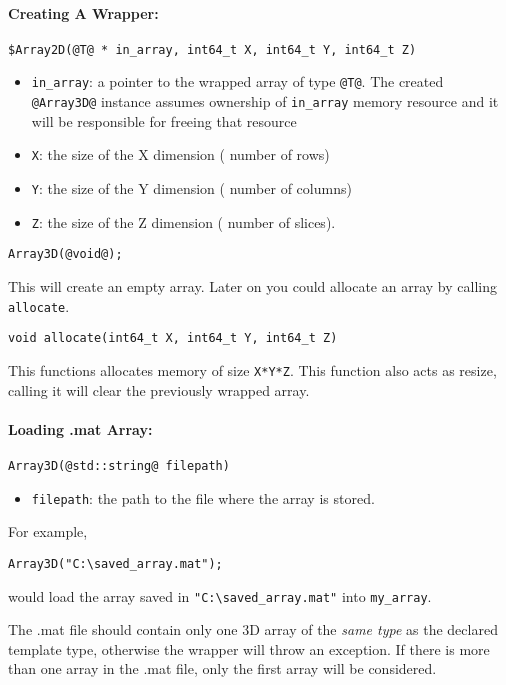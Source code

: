\documentclass[12pt,letterpaper]{article}
\makeatletter
\def\keyhl[#1]{\lstinline{@#1@}}
\makeatother
\begin{document}
\paragraph{Creating A Wrapper:}\hspace{-2ex}
\begin{lstlisting}
$Array2D(@T@ * in_array, int64_t X, int64_t Y, int64_t Z)
\end{lstlisting}
\begin{itemize}
\item \lstinline{in_array}: a pointer to the wrapped array of type \lstinline{@T@}. The created \keyhl[Array3D] instance assumes ownership of \lstinline{in_array} memory resource and it will be responsible for freeing that resource
\item \lstinline{X}: the size of the X dimension ( number of rows)
\item \lstinline{Y}: the size of the Y dimension ( number of columns)
\item \lstinline{Z}: the size of the Z dimension ( number of slices).
\end{itemize}

\begin{lstlisting}
Array3D(@void@);
\end{lstlisting}
This will create an empty array. Later on you could allocate an array by calling \lstinline{allocate}.
\begin{lstlisting}[backgroundcolor=\color{white}]
void allocate(int64_t X, int64_t Y, int64_t Z)
\end{lstlisting}
This functions allocates memory of size \lstinline{X*Y*Z}. This function also acts as resize, calling it will clear the previously wrapped array.

\paragraph{Loading .mat Array:}\hspace{-2ex}
\begin{lstlisting}
Array3D(@std::string@ filepath)
\end{lstlisting}
\begin{itemize}
\item \lstinline{filepath}: the path to the file where the array is stored.
\end{itemize}
For example,
\begin{lstlisting}[backgroundcolor=\color{white}]
Array3D("C:\saved_array.mat");
\end{lstlisting}
would load the array saved in \lstinline{"C:\saved_array.mat"} into \lstinline{my_array}.
\begin{tcolorbox}
The .mat file should contain only one 3D array of the {\em same type} as the declared template type, otherwise the wrapper will throw an exception. If there is more than one array in the .mat file, only the first array will be considered.
\end{tcolorbox}
\end{document}
